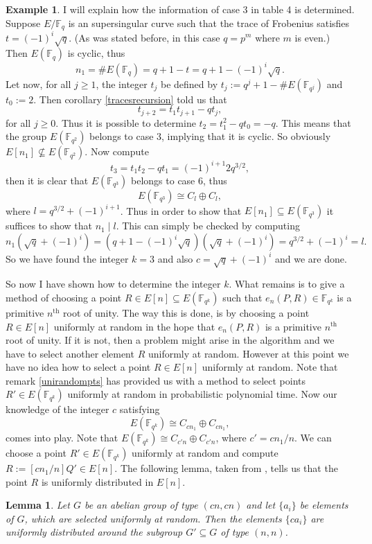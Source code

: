 \documentclass{article}
\numberwithin{equation}{section}
\newtheorem{lemma}[theorem]{Lemma}
\theoremstyle{definition}
\newtheorem{example}[theorem]{Example}
\newcommand{\FF}[1]{{\mathbb F}_{#1}} %
\begin{document}
\begin{example}
I will explain how the information of case 3 in table 4 is determined. Suppose $E/\FF{q}$ is an supersingular curve such that the trace of Frobenius satisfies $t=(-1)^i \sqrt{q}$. (As was stated before, in this case $q=p^m$ where $m$ is even.) Then $E(\FF{q})$ is cyclic, thus $$n_1 = \#E(\FF{q})=q+1-t=q+1-(-1)^i \sqrt{q}.$$ Let now, for all $j \geq 1$, the integer $t_j$ be defined by $t_j:=q^j+1-\#E(\FF{q^j})$ and $t_0:=2$. Then corollary \ref{tracesrecursion} told us that $$t_{j+2}=t_1t_{j+1}-qt_j,$$ for all $j \geq 0$. Thus it is possible to determine $t_2=t_1^2-qt_0=-q$. This means that the group $E(\FF{q^2})$ belongs to case 3, implying that it is cyclic. So obviously $E[n_1] \not \subseteq E(\FF{q^2})$. Now compute $$t_3=t_1t_2-qt_1=(-1)^{i+1}2q^{3/2},$$ then it is clear that $E(\FF{q^3})$ belongs to case 6, thus $$E(\FF{q^3}) \cong C_l \oplus C_l,$$ where $l=q^{3/2}+(-1)^{i+1}$. Thus in order to show that $E[n_1] \subseteq E(\FF{q^3})$ it suffices to show that $n_1 \mid l$. This can simply be checked by computing $$n_1(\sqrt{q}+(-1)^i) = (q+1-(-1)^i \sqrt{q})(\sqrt{q}+(-1)^i) = q^{3/2}+(-1)^i = l.$$ So we have found the integer $k=3$ and also $c=\sqrt{q}+(-1)^i$ and we are done.
\end{example}

So now I have shown how to determine the integer $k$. What remains is to give a method of choosing a point $R\in E[n] \subseteq E(\FF{q^k})$ such that $e_n(P,R) \in \FF{q^k}$ is a primitive $n^\text{th}$ root of unity. The way this is done, is by choosing a point $R\in E[n]$ uniformly at random in the hope that $e_n(P,R)$ is a primitive $n^\text{th}$ root of unity. If it is not, then a problem might arise in the algorithm and we have to select another element $R$ uniformly at random. However at this point we have no idea how to select a point $R \in E[n]$ uniformly at random. Note that remark \ref{unirandompts} has provided us with a method to select points $R' \in E(\FF{q^k})$ uniformly at random in probabilistic polynomial time. Now our knowledge of the integer $c$ satisfying $$E(\FF{q^k})\cong C_{cn_1}\oplus C_{cn_1},$$ comes into play. Note that $E(\FF{q^k}) \cong C_{c'n} \oplus C_{c'n}$, where $c'=cn_1/n$. We can choose a point $R' \in E(\FF{q^k})$ uniformly at random and compute $R:=[cn_1/n]Q'\in E[n]$. The following lemma, taken from \cite{MOVattack}, tells us that the point $R$ is uniformly distributed in $E[n]$. 

\begin{lemma}\label{unidistrgengroup}
Let $G$ be an abelian group of type $(cn,cn)$ and let $\{a_i\}$ be elements of $G$, which are selected uniformly at random. Then the elements $\{ca_i\}$ are uniformly distributed around the subgroup $G' \subseteq G$ of type $(n,n)$. 
\end{lemma}
\end{document}
